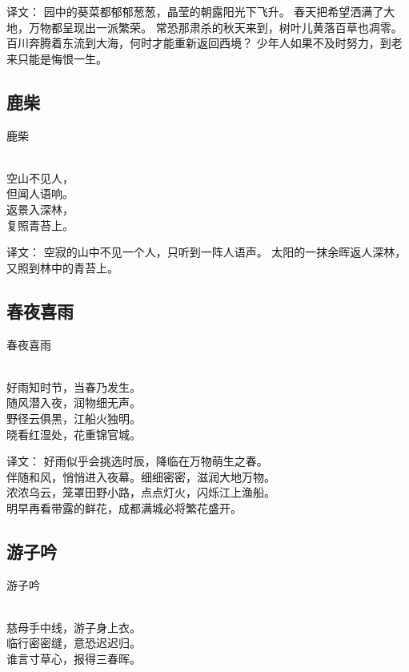 译文：
园中的葵菜都郁郁葱葱，晶莹的朝露阳光下飞升。
春天把希望洒满了大地，万物都呈现出一派繁荣。
常恐那肃杀的秋天来到，树叶儿黄落百草也凋零。
百川奔腾着东流到大海，何时才能重新返回西境？
少年人如果不及时努力，到老来只能是悔恨一生。

\subsection{鹿柴}

\noindent 鹿柴

  \\

\noindent 空山不见人，\\但闻人语响。\\
返景入深林，\\复照青苔上。

译文：
空寂的山中不见一个人，只听到一阵人语声。
太阳的一抹余晖返人深林，又照到林中的青苔上。

\subsection{春夜喜雨}

\noindent 春夜喜雨

  \\

\noindent 好雨知时节，当春乃发生。\\
随风潜入夜，润物细无声。\\
野径云俱黑，江船火独明。\\
晓看红湿处，花重锦官城。

译文：
好雨似乎会挑选时辰，降临在万物萌生之春。\\
伴随和风，悄悄进入夜幕。细细密密，滋润大地万物。\\
浓浓乌云，笼罩田野小路，点点灯火，闪烁江上渔船。\\
明早再看带露的鲜花，成都满城必将繁花盛开。

\subsection{游子吟}

\noindent 游子吟

  \\

\noindent 慈母手中线，游子身上衣。\\
临行密密缝，意恐迟迟归。\\
谁言寸草心，报得三春晖。


